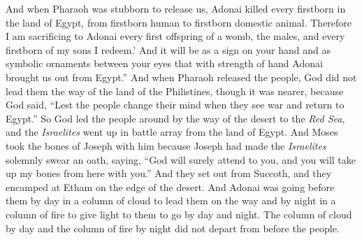 \begin{biblechapter}
\verse And when Pharaoh was stubborn to release us, Adonai killed every firstborn in the land of Egypt, from firstborn human to firstborn domestic animal. Therefore I am sacrificing to Adonai every first offspring of a womb, the males, and every firstborn of my sons I redeem.’
\verse And it will be as a sign on your hand and as symbolic ornaments between your eyes that with strength of hand Adonai brought us out from Egypt.”
 And when Pharaoh released the people, God did not lead them the way of the land of the Philistines, though it was nearer, because God said, “Lest the people change their mind when they see war and return to Egypt.”
\verse So God led the people around by the way of the desert to the \textit{Red Sea}, and the \textit{Israelites} went up in battle array from the land of Egypt.
\verse And Moses took the bones of Joseph with him because Joseph had made the \textit{Israelites} solemnly swear an oath, saying, “God will surely attend to you, and you will take up my bones from here with you.”
\verse And they set out from Succoth, and they encamped at Etham on the edge of the desert.
\verse And Adonai was going before them by day in a column of cloud to lead them on the way and by night in a column of fire to give light to them to go by day and night.
\verse The column of cloud by day and the column of fire by night did not depart from before the people.
\end{biblechapter}

